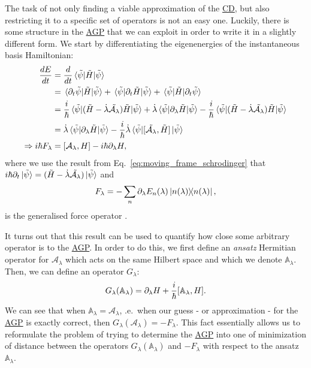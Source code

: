 \documentclass[a4paper,oneside,11pt]{book}
\newcommand{\dlambda}{\partial_{\lambda}}
\newcommand{\AGP}[1]{\mathcal{A}_{#1}}
\newcommand{\dotlambda}{\dot{\lambda}}
\newcommand{\approxAGP}{\mathbb{A}_{\lambda}}
\newcommand{\acrref}[1]{\hyperref[acr:#1]{#1}}
\begin{document}
    The task of not only finding a viable approximation of the \acrref{CD}, but also restricting it to a specific set of operators is not an easy one. Luckily, there is some structure in the \acrref{AGP} that we can exploit in order to write it in a slightly different form. We start by differentiating the eigenenergies of the instantaneous basis Hamiltonian:
    \begin{equation}\label{eq:energy_derivative}
        \begin{aligned}
            \frac{dE}{dt} &= \frac{d}{dt}\ev*{\Tilde{H}}{\Tilde{\psi}} \\
            &= \mel*{\partial_t \Tilde{\psi}}{\Tilde{H}}{\Tilde{\psi}} + \mel*{\Tilde{\psi}}{\partial_t \Tilde{H}}{\Tilde{\psi}} + \mel*{\Tilde{\psi}}{\Tilde{H}}{\partial_t \Tilde{\psi}} \\
            &= \frac{i}{\hbar}\ev*{(\Tilde{H} - \dotlambda \Tilde{\AGP{\lambda}})\Tilde{H}}{\Tilde{\psi}} + \dotlambda \ev*{\dlambda \Tilde{H}}{\Tilde{\psi}} - \frac{i}{\hbar}\ev*{(\Tilde{H} - \dotlambda \Tilde{\AGP{\lambda}})\Tilde{H}}{\Tilde{\psi}}\\
            &= \dotlambda \ev*{\dlambda \Tilde{H}}{\Tilde{\psi}} - \frac{i}{\hbar} \dotlambda \ev*{\comm*{\Tilde{\AGP{\lambda}}}{\Tilde{H}}}{\Tilde{\psi}} \\
            \Rightarrow i\hbar F_{\lambda} &= \comm{\AGP{\lambda}}{H} - i \hbar \dlambda H,
        \end{aligned}
    \end{equation}
    where we use the result from Eq.~\eqref{eq:moving_frame_schrodinger} that $i\hbar \partial_t \ket*{\Tilde{\psi}} = (\Tilde{H} - \dotlambda \Tilde{\AGP{\lambda}})\ket*{\Tilde{\psi}}$ and
    \begin{equation}\label{eq:generalized_force_operator}
        F_{\lambda} = - \sum_n \dlambda E_n(\lambda) \dyad{n(\lambda)},
    \end{equation}
    is the generalised force operator \cite{kolodrubetz_geometry_2017,sels_minimizing_2017,jarzynski_generating_2013}. 

    It turns out that this result can be used to quantify how close some arbitrary operator is to the \acrref{AGP}. In order to do this, we first define an \emph{ansatz} Hermitian operator for $\AGP{\lambda}$ which acts on the same Hilbert space and which we denote $\approxAGP$. Then, we can define an operator $G_{\lambda}$:
    \begin{equation}\label{eq:G_operator}
        G_{\lambda}(\approxAGP) = \dlambda H + \frac{i}{\hbar} \comm{\approxAGP}{H}.
    \end{equation}
    We can see that when $\approxAGP = \AGP{\lambda}$, \@i.e.~when our guess - or approximation - for the \acrref{AGP} is exactly correct, then $G_{\lambda}(\AGP{\lambda}) = - F_{\lambda}$. This fact essentially allows us to reformulate the problem of trying to determine the \acrref{AGP} into one of minimization of distance between the operators $G_{\lambda}(\approxAGP)$ and $-F_{\lambda}$ with respect to the ansatz $\approxAGP$. 
\end{document}
